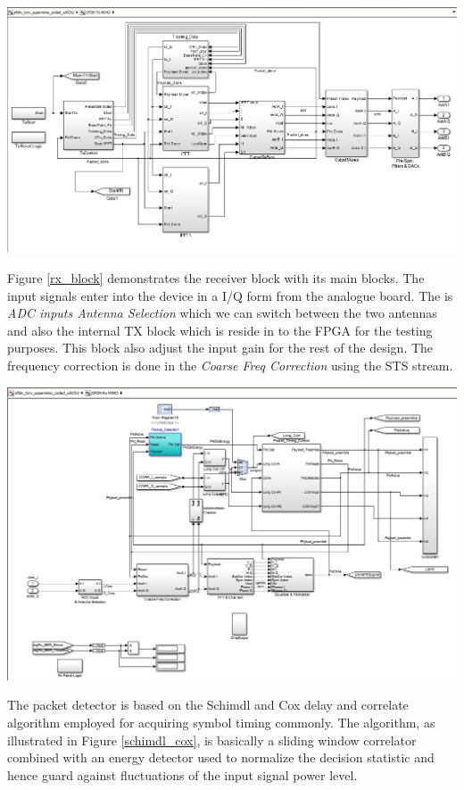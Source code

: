 \begin{center}
\includegraphics[width=\textwidth]{content/fig/txblock.JPG}
\label{tx_block}
\end{center}

Figure \ref{rx_block} demonstrates the receiver block with its main blocks. The input signals enter into the device in a I/Q form from the analogue board. The is \textit{ADC inputs Antenna Selection} which we can switch between the two antennas and also the internal TX block which is reside in to the FPGA for the testing purposes. This block also adjust the input gain for the rest of the design. The frequency correction is done in the \textit{Coarse Freq Correction} using the STS stream.  
\begin{center}
\includegraphics[width=\textwidth]{content/fig/rxblock.JPG}
\label{rx_block}
\end{center}

The packet detector is based on the Schimdl and Cox delay and correlate algorithm employed for acquiring symbol timing commonly. The algorithm, as illustrated in Figure \ref{schimdl_cox}, is basically a sliding window correlator combined with an energy detector used to normalize the decision statistic and hence guard against fluctuations of the input signal power level.\\


